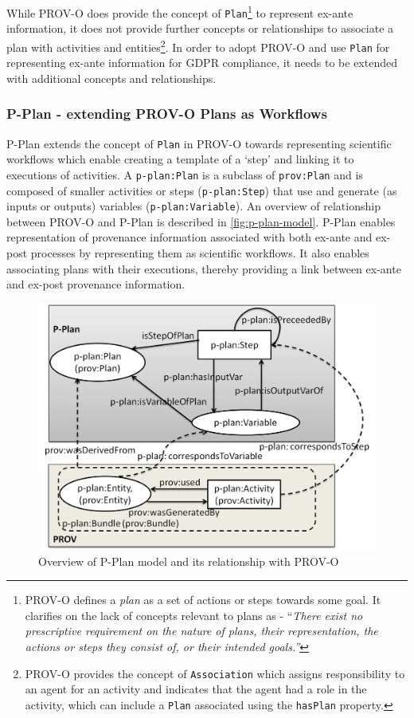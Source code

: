 While PROV-O does provide the concept of \texttt{Plan}\footnote{PROV-O defines a \textit{plan} as a set of actions or steps towards some goal. It clarifies on the lack of concepts relevant to plans as - ``\textit{There exist no prescriptive requirement on the nature of plans, their representation, the actions or steps they consist of, or their intended goals.''}} to represent ex-ante information, it does not provide further concepts or relationships to associate a plan with activities and entities\footnote{PROV-O provides the concept of \texttt{Association} which assigns responsibility to an agent for an activity and indicates that the agent had a role in the activity, which can include a \texttt{Plan} associated using the \texttt{hasPlan} property.}.
In order to adopt PROV-O and use \texttt{Plan} for representing ex-ante information for GDPR compliance, it needs to be extended with additional concepts and relationships.

\subsubsection{P-Plan - extending PROV-O Plans as Workflows}
P-Plan \cite{garijo_p-plan_2014} extends the concept of \texttt{Plan} in PROV-O towards representing scientific
workflows which enable creating a template of a `step' and linking it to executions of activities.
A \texttt{p-plan:Plan} is a subclass of \texttt{prov:Plan} and is composed of smaller activities or steps (\texttt{p-plan:Step}) that use and generate (as inputs or outputs) variables (\texttt{p-plan:Variable}).
An overview of relationship between PROV-O and P-Plan is described in \autoref{fig:p-plan-model}.
P-Plan enables representation of provenance information associated with both ex-ante and ex-post processes by representing them as scientific workflows. It also enables associating plans with their executions, thereby providing a link between ex-ante and ex-post provenance information.
\begin{figure}[htbp]
    \centering
    \includegraphics[width=0.75\linewidth]{img/p-plan-model.png}
    \caption{Overview of P-Plan model and its relationship with PROV-O \cite{garijo_p-plan_2014}}
    \label{fig:p-plan-model}
\end{figure}

